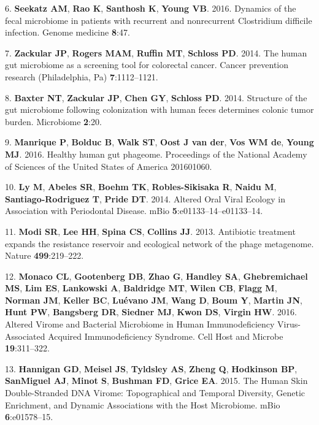 \documentclass[12pt,]{article}
\begin{document}
\hypertarget{ref-Seekatz:2016fz}{}
6. \textbf{Seekatz AM}, \textbf{Rao K}, \textbf{Santhosh K},
\textbf{Young VB}. 2016. Dynamics of the fecal microbiome in patients
with recurrent and nonrecurrent Clostridium difficile infection. Genome
medicine \textbf{8}:47.

\hypertarget{ref-Zackular:2014fba}{}
7. \textbf{Zackular JP}, \textbf{Rogers MAM}, \textbf{Ruffin MT},
\textbf{Schloss PD}. 2014. The human gut microbiome as a screening tool
for colorectal cancer. Cancer prevention research (Philadelphia, Pa)
\textbf{7}:1112--1121.

\hypertarget{ref-Baxter:2014hb}{}
8. \textbf{Baxter NT}, \textbf{Zackular JP}, \textbf{Chen GY},
\textbf{Schloss PD}. 2014. Structure of the gut microbiome following
colonization with human feces determines colonic tumor burden.
Microbiome \textbf{2}:20.

\hypertarget{ref-Manrique:2016dx}{}
9. \textbf{Manrique P}, \textbf{Bolduc B}, \textbf{Walk ST},
\textbf{Oost J van der}, \textbf{Vos WM de}, \textbf{Young MJ}. 2016.
Healthy human gut phageome. Proceedings of the National Academy of
Sciences of the United States of America 201601060.

\hypertarget{ref-Ly:2014ew}{}
10. \textbf{Ly M}, \textbf{Abeles SR}, \textbf{Boehm TK},
\textbf{Robles-Sikisaka R}, \textbf{Naidu M}, \textbf{Santiago-Rodriguez
T}, \textbf{Pride DT}. 2014. Altered Oral Viral Ecology in Association
with Periodontal Disease. mBio \textbf{5}:e01133--14--e01133--14.

\hypertarget{ref-Modi:2013fia}{}
11. \textbf{Modi SR}, \textbf{Lee HH}, \textbf{Spina CS},
\textbf{Collins JJ}. 2013. Antibiotic treatment expands the resistance
reservoir and ecological network of the phage metagenome. Nature
\textbf{499}:219--222.

\hypertarget{ref-Monaco:2016ita}{}
12. \textbf{Monaco CL}, \textbf{Gootenberg DB}, \textbf{Zhao G},
\textbf{Handley SA}, \textbf{Ghebremichael MS}, \textbf{Lim ES},
\textbf{Lankowski A}, \textbf{Baldridge MT}, \textbf{Wilen CB},
\textbf{Flagg M}, \textbf{Norman JM}, \textbf{Keller BC},
\textbf{Luévano JM}, \textbf{Wang D}, \textbf{Boum Y}, \textbf{Martin
JN}, \textbf{Hunt PW}, \textbf{Bangsberg DR}, \textbf{Siedner MJ},
\textbf{Kwon DS}, \textbf{Virgin HW}. 2016. Altered Virome and Bacterial
Microbiome in Human Immunodeficiency Virus-Associated Acquired
Immunodeficiency Syndrome. Cell Host and Microbe \textbf{19}:311--322.

\hypertarget{ref-Hannigan:2015fz}{}
13. \textbf{Hannigan GD}, \textbf{Meisel JS}, \textbf{Tyldsley AS},
\textbf{Zheng Q}, \textbf{Hodkinson BP}, \textbf{SanMiguel AJ},
\textbf{Minot S}, \textbf{Bushman FD}, \textbf{Grice EA}. 2015. The
Human Skin Double-Stranded DNA Virome: Topographical and Temporal
Diversity, Genetic Enrichment, and Dynamic Associations with the Host
Microbiome. mBio \textbf{6}:e01578--15.
\end{document}
